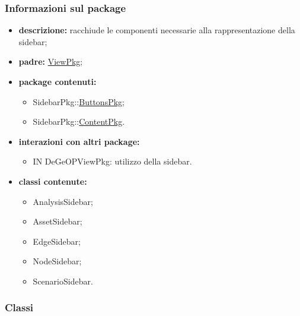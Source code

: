 \subsubsection{Informazioni sul package}
\begin{itemize}
	\item \textbf{descrizione:} racchiude le componenti necessarie alla rappresentazione della sidebar;
	\item \textbf{padre:} \hyperref[pkg::ViewPkg]{ViewPkg};
	\item \textbf{package contenuti:}
	\begin{itemize}
		\item SidebarPkg::\hyperref[pkg::ButtonsPkg]{ButtonsPkg};
		\item SidebarPkg::\hyperref[pkg::ContentPkg]{ContentPkg}.
	\end{itemize}
	\item \textbf{interazioni con altri package:} 
	\begin{itemize}
		\item IN DeGeOPViewPkg: utilizzo della sidebar.
	\end{itemize}
	\item \textbf{classi contenute:}
	\begin{itemize}
		\item AnalysisSidebar;
		\item AssetSidebar;
		\item EdgeSidebar;
		\item NodeSidebar;
		\item ScenarioSidebar.
	\end{itemize}
\end{itemize}
\subsubsection{Classi}
